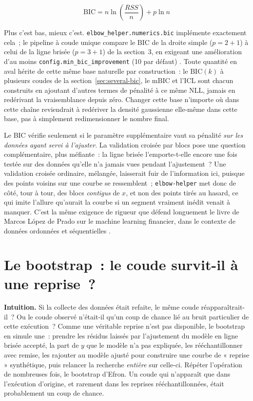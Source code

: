 \documentclass[11pt]{article}
\newcommand{\code}[1]{\texttt{#1}}
\begin{document}
\begin{equation}
\mathrm{BIC} = n \ln\!\left(\frac{RSS}{n}\right) + p \ln n
\end{equation}

Plus c'est bas, mieux c'est. \code{elbow\_helper.numerics.bic} implémente
exactement cela~; le pipeline à coude unique compare le $\mathrm{BIC}$ de
la droite simple ($p = 2 + 1$) à celui de la ligne brisée ($p = 3 + 1$) de
la section~3, en exigeant une amélioration d'au moins
\code{config.min\_bic\_improvement} (10 par défaut) \citep{schwarz1978}
\citep{hastie2009esl} \citep{bishop2006prml}. Toute quantité en aval
hérite de cette même base naturelle par construction~: le $\mathrm{BIC}(k)$
à plusieurs coudes de la section~\ref{sec:several-bic}, le $\mathrm{mBIC}$
et l'ICL sont chacun construits en ajoutant d'autres termes de pénalité à
ce même $\mathrm{NLL}$, jamais en redérivant la vraisemblance depuis zéro.
Changer cette base n'importe où dans cette chaîne reviendrait à redériver
la densité gaussienne elle-même dans cette base, pas à simplement
redimensionner le nombre final.

Le BIC vérifie seulement si le paramètre supplémentaire vaut sa pénalité
\emph{sur les données ayant servi à l'ajuster}. La validation croisée par
blocs pose une question complémentaire, plus méfiante~: la ligne brisée
l'emporte-t-elle encore une fois testée sur des données qu'elle n'a jamais
vues pendant l'ajustement~? Une validation croisée ordinaire, mélangée,
laisserait fuir de l'information ici, puisque des points voisins sur une
courbe se ressemblent~; \code{elbow-helper} met donc de côté, tour à tour,
des blocs \emph{contigus} de $x$, et non des points tirés au hasard, ce qui
imite l'allure qu'aurait la courbe si un segment vraiment inédit venait à
manquer. C'est la même exigence de rigueur que défend longuement le livre
de Marcos L\'opez de Prado sur le machine learning financier, dans le
contexte de données ordonnées et séquentielles
\citeyearpar{lopezdeprado2018financial}.

\section{Le bootstrap~: le coude survit-il à une reprise~?}
\label{sec:bootstrap}

\textbf{Intuition.} Si la collecte des données était refaite, le même
coude réapparaîtrait-il~? Ou le coude observé n'était-il qu'un coup de
chance lié au bruit particulier de cette exécution~? Comme une véritable
reprise n'est pas disponible, le bootstrap en simule une~: prendre les
résidus laissés par l'ajustement du modèle en ligne brisée accepté, la part
de $y$ que le modèle n'a pas expliquée, les rééchantillonner avec remise,
les rajouter au modèle ajusté pour construire une courbe de « reprise »
synthétique, puis relancer la recherche \emph{entière} sur celle-ci.
Répéter l'opération de nombreuses fois, le bootstrap d'Efron. Un coude qui
n'apparaît que dans l'exécution d'origine, et rarement dans les reprises
rééchantillonnées, était probablement un coup de chance.
\end{document}
